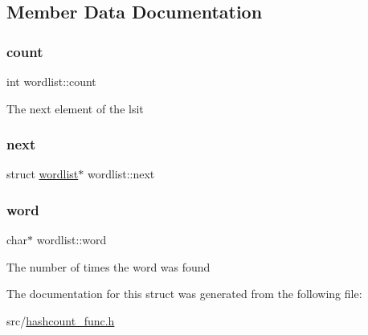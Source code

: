 \subsection{Member Data Documentation}
\mbox{\label{structwordlist_a472cb03a36de8c3507bcf07abf56a607}} 
\subsubsection{\texorpdfstring{count}{count}}
{\footnotesize\ttfamily int wordlist\+::count}

The next element of the lsit \mbox{\label{structwordlist_a6a9fb0cf06d47f1bf57f0c71889cb889}} 
\subsubsection{\texorpdfstring{next}{next}}
{\footnotesize\ttfamily struct \hyperlink{structwordlist}{wordlist}$\ast$ wordlist\+::next}

\mbox{\label{structwordlist_adf182e526a01f9bcf7e01e869a7de1a3}} 
\subsubsection{\texorpdfstring{word}{word}}
{\footnotesize\ttfamily char$\ast$ wordlist\+::word}

The number of times the word was found 

The documentation for this struct was generated from the following file\+:\begin{DoxyCompactItemize}
\item 
src/\hyperlink{hashcount__func_8h}{hashcount\+\_\+func.\+h}\end{DoxyCompactItemize}
